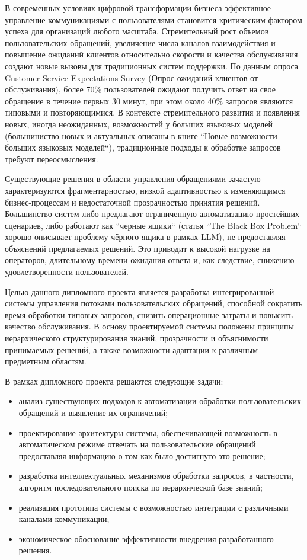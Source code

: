 
В современных условиях цифровой трансформации бизнеса эффективное управление коммуникациями с пользователями становится критическим фактором успеха для организаций любого масштаба. Стремительный рост объемов пользовательских обращений, увеличение числа каналов взаимодействия и повышение ожиданий клиентов относительно скорости и качества обслуживания создают новые вызовы для традиционных систем поддержки. По данным опроса Customer Service Expectations Survey\cite{gladlyReport} (Опрос ожиданий клиентов от обслуживания), более 70\% пользователей ожидают получить ответ на свое обращение в течение первых 30 минут, при этом около 40\% запросов являются типовыми и повторяющимися. В контексте стремительного развития и появления новых, иногда неожиданных, возможностей у больших языковых моделей (большиниство новых и актуальных описаны в книге ``Новые возможности больших языковых моделей``\cite{wei2022emergent}), традиционные подходы к обработке запросов требуют переосмысления.

Существующие решения в области управления обращениями зачастую характеризуются фрагментарностью, низкой адаптивностью к изменяющимся бизнес-процессам и недостаточной прозрачностью принятия решений. Большинство систем либо предлагают ограниченную автоматизацию простейших сценариев, либо работают как ``черные ящики`` (статья ``The Black Box Problem``\cite{blackBox} хорошо описывает проблему чёрного ящика в рамках LLM), не предоставляя объяснений предлагаемых решений. Это приводит к высокой нагрузке на операторов, длительному времени ожидания ответа и, как следствие, снижению удовлетворенности пользователей.

Целью данного дипломного проекта является разработка интегрированной системы управления потоками пользовательских обращений, способной  сократить время обработки типовых запросов, снизить операционные затраты и повысить качество обслуживания. В основу проектируемой системы положены принципы иерархического структурирования знаний, прозрачности и объяснимости принимаемых решений, а также возможности адаптации к различным предметным областям.

В рамках дипломного проекта решаются следующие задачи:

\begin{itemize}
\item анализ существующих подходов к автоматизации обработки пользовательских обращений и выявление их ограничений;
\item проектирование архитектуры системы, обеспечивающей возможность в автоматическом режиме отвечать на пользовательские обращений предоставляя информацию о том как было достигнуто это решение;
\item разработка интеллектуальных механизмов обработки запросов, в частности, алгоритм последовательного поиска по иерархической базе знаний;
\item реализация прототипа системы с возможностью интеграции с различными каналами коммуникации;
\item экономическое обоснование эффективности внедрения разработанного решения.
\end{itemize}

